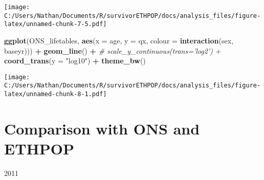 \documentclass[
]{article}
\newenvironment{Shaded}{\begin{snugshade}}{\end{snugshade}}
\newcommand{\CommentTok}[1]{\textcolor[rgb]{0.56,0.35,0.01}{\textit{#1}}}
\newcommand{\DataTypeTok}[1]{\textcolor[rgb]{0.13,0.29,0.53}{#1}}
\newcommand{\DecValTok}[1]{\textcolor[rgb]{0.00,0.00,0.81}{#1}}
\newcommand{\KeywordTok}[1]{\textcolor[rgb]{0.13,0.29,0.53}{\textbf{#1}}}
\newcommand{\NormalTok}[1]{#1}
\newcommand{\OperatorTok}[1]{\textcolor[rgb]{0.81,0.36,0.00}{\textbf{#1}}}
\newcommand{\StringTok}[1]{\textcolor[rgb]{0.31,0.60,0.02}{#1}}
\begin{document}
\texttt{[image: C:/Users/Nathan/Documents/R/survivorETHPOP/docs/analysis\_files/figure-latex/unnamed-chunk-7-5.pdf]}

\begin{Shaded}
\begin{Highlighting}[]
\KeywordTok{ggplot}\NormalTok{(ONS_lifetables, }\KeywordTok{aes}\NormalTok{(}\DataTypeTok{x =}\NormalTok{ age, }\DataTypeTok{y =}\NormalTok{ qx, }\DataTypeTok{colour =} \KeywordTok{interaction}\NormalTok{(sex, baseyr))) }\OperatorTok{+}
\StringTok{  }\KeywordTok{geom_line}\NormalTok{() }\OperatorTok{+}
\StringTok{  }\CommentTok{# scale_y_continuous(trans='log2') +}
\StringTok{  }\KeywordTok{coord_trans}\NormalTok{(}\DataTypeTok{y =} \StringTok{"log10"}\NormalTok{) }\OperatorTok{+}
\StringTok{  }\KeywordTok{theme_bw}\NormalTok{()}
\end{Highlighting}
\end{Shaded}

\texttt{[image: C:/Users/Nathan/Documents/R/survivorETHPOP/docs/analysis\_files/figure-latex/unnamed-chunk-8-1.pdf]}

\hypertarget{comparison-with-ons-and-ethpop}{%
\section{Comparison with ONS and
ETHPOP}\label{comparison-with-ons-and-ethpop}}

2011

\begin{Shaded}
\end{Shaded}
\end{document}
